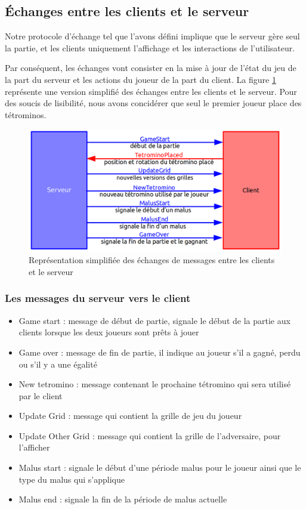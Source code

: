 \documentclass[a4paper, 12pt]{article}
\begin{document}
		\subsection{\'Echanges entre les clients et le serveur}

			Notre protocole d'échange tel que l'avons défini implique que le serveur gère seul la partie, et les clients uniquement l'affichage et les interactions de l'utilisateur.

			Par conséquent, les échanges vont consister en la mise à jour de l'état du jeu de la part du serveur et les actions du joueur de la part du client. 
			La figure \ref{fig:echange} représente une version simplifié des échanges entre les clients et le serveur. Pour des soucis de lisibilité, nous avons concidérer que seul le premier joueur place des tétrominos.

			\begin{figure}[bt]
				\centering
				\includegraphics[scale=0.45]{img/ech.png}
				\caption{Représentation simplifiée des échanges de messages entre les clients et le serveur}
				\label{fig:echange}
			\end{figure}


			\subsubsection{Les messages du serveur vers le client}

				\begin{itemize}
					\item Game start : message de début de partie, signale le début de la partie aux clients lorsque les deux joueurs sont prêts à jouer
					\item Game over : message de fin de partie, il indique au joueur s'il a gagné, perdu ou s'il y a une égalité
					\item New tetromino : message contenant le prochaine tétromino qui sera utilisé par le client
					\item Update Grid : message qui contient la grille de jeu du joueur
					\item Update Other Grid : message qui contient la grille de l'adversaire, pour l'afficher
					\item Malus start : signale le début d'une période malus pour le joueur ainsi que le type du malus qui s'applique
					\item Malus end : signale la fin de la période de malus actuelle
				\end{itemize}
\end{document}
